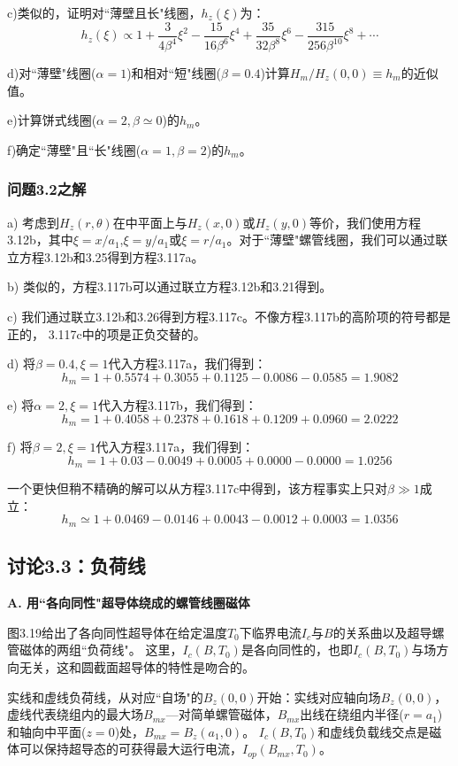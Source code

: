 c)类似的，证明对``薄壁且长"线圈，$h_z(\xi)$为：
\begin{equation*}
h_z(\xi)\propto1+\frac{3}{4\beta^4}\xi^2-\frac{15}{16\beta^6}\xi^4+\frac{35}{32\beta^8}\xi^6-\frac{315}{256\beta^{10}}\xi^8+\cdots\tag{3.117c}%
\end{equation*}

d)对``薄壁"线圈($\alpha=1$)和相对``短"线圈($\beta=0.4$)计算$H_m/H_z(0, 0)\equiv h_m$的近似值。

e)计算饼式线圈($\alpha=2,\beta\simeq 0$)的$h_m$。

f)确定``薄壁"且``长"线圈($\alpha=1,\beta=2$)的$h_m$。 

\subsubsection{问题3.2之解}
a) 考虑到$H_z(r,\theta)$在中平面上与$H_z(x, 0)$或$H_z(y, 0)$等价，我们使用方程3.12b，其中$\xi = x/a_1$,$\xi = y/a_1$或$\xi = r/a_1$。对于``薄壁"螺管线圈，我们可以通过联立方程3.12b和3.25得到方程3.117a。

b) 类似的，方程3.117b可以通过联立方程3.12b和3.21得到。

c) 我们通过联立3.12b和3.26得到方程3.117c。不像方程3.117b的高阶项的符号都是正的，
3.117c中的项是正负交替的。 

d) 将$\beta=0.4,\xi=1$代入方程3.117a，我们得到：
$$h_m=1 + 0.5574 + 0.3055 + 0.1125 − 0.0086 − 0.0585 = 1.9082$$

e) 将$\alpha=2,\xi=1$代入方程3.117b，我们得到：
$$ h_m=1 + 0.4058 + 0.2378 + 0.1618 + 0.1209 + 0.0960 = 2.0222$$

f) 将$\beta=2,\xi=1$代入方程3.117a，我们得到：
$$ h_m=1 + 0.03 − 0.0049 + 0.0005 + 0.0000 − 0.0000 = 1.0256 $$

一个更快但稍不精确的解可以从方程3.117c中得到，该方程事实上只对$\beta\gg 1$成立：
$$h_m \simeq 1 + 0.0469 − 0.0146 + 0.0043 − 0.0012 + 0.0003 = 1.0356$$



\subsection{讨论3.3：负荷线}
\textbf{A. 用``各向同性"超导体绕成的螺管线圈磁体}

图3.19给出了各向同性超导体在给定温度$T_0$下临界电流$I_c$与$B$的关系曲以及超导螺管磁体的两组``负荷线"。
这里，$I_c(B,T_0)$是各向同性的，也即$I_c(B,T_0)$与场方向无关，这和圆截面超导体的特性是吻合的。

实线和虚线负荷线，从对应``自场"的$B_z(0,0)$开始：实线对应轴向场$B_z(0,0)$，虚线代表绕组内的最大场$B_{mx}$---对简单螺管磁体，$B_{mx}$出线在绕组内半径($r=a_1$)和轴向中平面($z=0$)处，$B_{mx}=B_z(a_1,0)$。
$I_c(B,T_0)$和虚线负载线交点是磁体可以保持超导态的可获得最大运行电流，$I_{op}(B_{mx},T_0)$。

